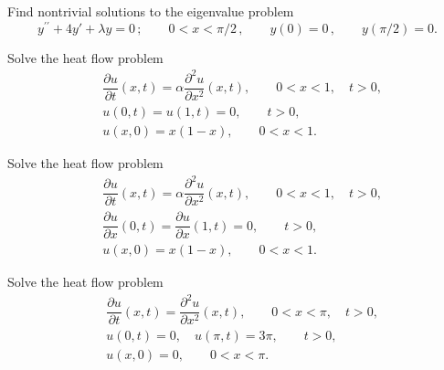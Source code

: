 \documentclass[11pt]{article}
\begin{document}
\begin{problem}
 Find nontrivial solutions to the eigenvalue problem
\begin{equation*}
y^{\prime \prime} + 4 y' + \lambda y =0\,; \qquad  0<x<\pi/2 \,, \qquad y(0)=0  \,,\qquad y(\pi/2) =0. 
\end{equation*}
\end{problem}




\begin{problem}
Solve the heat flow problem
\begin{equation*} \begin{split}
& \dfrac{\partial u }{\partial t } (x,t) = \alpha \dfrac{\partial^2 u}{\partial x^2}(x,t), \qquad 0<x<1, \quad t>0, \\
& u(0,t) = u(1,t)=0, \qquad t>0, \\
& u(x,0) = x(1-x), \qquad 0<x<1.
\end{split}\end{equation*}
\end{problem}


\begin{problem}
Solve the heat flow problem
\begin{equation*} \begin{split}
& \dfrac{\partial u }{\partial t } (x,t) = \alpha \dfrac{\partial^2 u}{\partial x^2}(x,t), \qquad 0<x<1, \quad t>0, \\
& \dfrac{\partial u }{\partial x } (0,t) = \dfrac{\partial u }{\partial x } (1,t)=0, \qquad t>0, \\
& u(x,0) = x(1-x), \qquad 0<x<1.
\end{split}\end{equation*}
\end{problem}


\begin{problem}
Solve the heat flow problem
\begin{equation*} \begin{split}
& \dfrac{\partial u }{\partial t } (x,t) = \dfrac{\partial^2 u}{\partial x^2}(x,t), \qquad 0<x<\pi, \quad t>0, \\
& u(0,t) = 0, \quad u(\pi,t)= 3\pi, \qquad t>0, \\
& u(x,0) = 0, \qquad 0<x<\pi.
\end{split}\end{equation*}
\end{problem}
\end{document}
